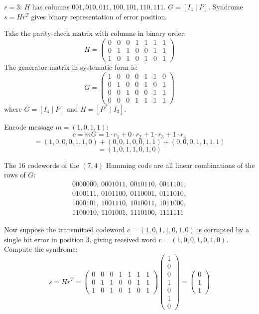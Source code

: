 \begin{example}
$r=3$: $H$ has columns $001, 010, 011, 100, 101, 110, 111$. $G = [I_4 \mid P]$. Syndrome $s = H r^T$ gives binary representation of error position.
\end{example}

\begin{example}
Take the parity-check matrix with columns in binary order:
\[
H = \begin{pmatrix}
0 & 0 & 0 & 1 & 1 & 1 & 1 \\
0 & 1 & 1 & 0 & 0 & 1 & 1 \\
1 & 0 & 1 & 0 & 1 & 0 & 1
\end{pmatrix}
\]
The generator matrix in systematic form is:
\[
G = \begin{pmatrix}
1 & 0 & 0 & 0 & 1 & 1 & 0 \\
0 & 1 & 0 & 0 & 1 & 0 & 1 \\
0 & 0 & 1 & 0 & 0 & 1 & 1 \\
0 & 0 & 0 & 1 & 1 & 1 & 1
\end{pmatrix}
\]
where $G = [I_4 \mid P]$ and $H = [P^T \mid I_3]$.

Encode message $m = (1,0,1,1)$:
\[
c = mG = 1\cdot r_1 + 0\cdot r_2 + 1\cdot r_3 + 1\cdot r_4
\]
\[
= (1,0,0,0,1,1,0) + (0,0,1,0,0,1,1) + (0,0,0,1,1,1,1)
\]
\[
= (1,0,1,1,0,1,0)
\]

The 16 codewords of the $(7,4)$ Hamming code are all linear combinations of the rows of $G$:
\[
\begin{array}{ll}
0000000,\ 0001011,\ 0010110,\ 0011101,\\
0100111,\ 0101100,\ 0110001,\ 0111010,\\
1000101,\ 1001110,\ 1010011,\ 1011000,\\
1100010,\ 1101001,\ 1110100,\ 1111111
\end{array}
\]

Now suppose the transmitted codeword $c = (1,0,1,1,0,1,0)$ is corrupted by a single bit error in position 3, giving received word $r = (1,0,0,1,0,1,0)$. Compute the syndrome:
\[
s = H r^T = \begin{pmatrix}0&0&0&1&1&1&1\\0&1&1&0&0&1&1\\1&0&1&0&1&0&1\end{pmatrix} \begin{pmatrix}1\\0\\0\\1\\0\\1\\0\end{pmatrix}
= \begin{pmatrix}0\\1\\1\end{pmatrix}
\]


\end{example}
